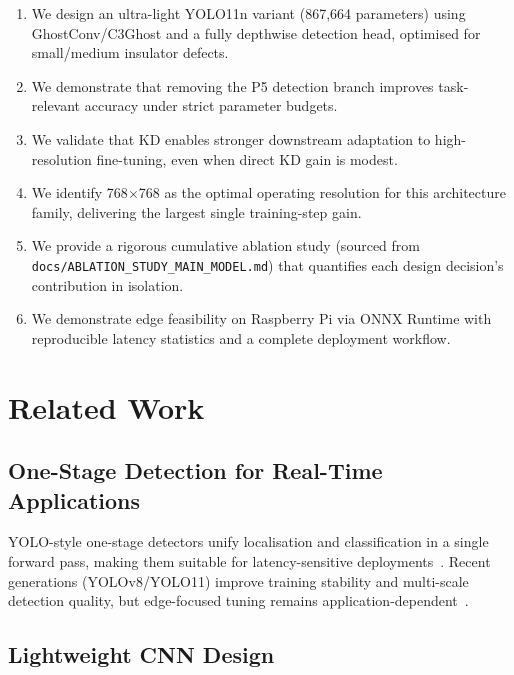 \documentclass[11pt,a4paper]{article}
\begin{document}
\begin{enumerate}[leftmargin=2em]
  \item We design an ultra-light YOLO11n variant (867,664 parameters) using
    GhostConv/C3Ghost and a fully depthwise detection head, optimised for
    small/medium insulator defects.
  \item We demonstrate that removing the P5 detection branch improves task-relevant
    accuracy under strict parameter budgets.
  \item We validate that KD enables stronger downstream adaptation to
    high-resolution fine-tuning, even when direct KD gain is modest.
  \item We identify 768$\times$768 as the optimal operating resolution for this
    architecture family, delivering the largest single training-step gain.
  \item We provide a rigorous cumulative ablation study (sourced from
    \texttt{docs/ABLATION\_STUDY\_MAIN\_MODEL.md}) that quantifies each design
    decision's contribution in isolation.
  \item We demonstrate edge feasibility on Raspberry Pi via ONNX Runtime with
    reproducible latency statistics and a complete deployment workflow.
\end{enumerate}

\section{Related Work}
\label{sec:related}

\subsection{One-Stage Detection for Real-Time Applications}

YOLO-style one-stage detectors unify localisation and classification in a single forward
pass, making them suitable for latency-sensitive deployments~\cite{redmon2016yolo,
bochkovskiy2020yolov4, wang2022yolov7}. Recent generations (YOLOv8/YOLO11) improve
training stability and multi-scale detection quality, but edge-focused tuning remains
application-dependent~\cite{ultralytics2023yolov8, ultralytics2024yolo11}.

\subsection{Lightweight CNN Design}
\end{document}
